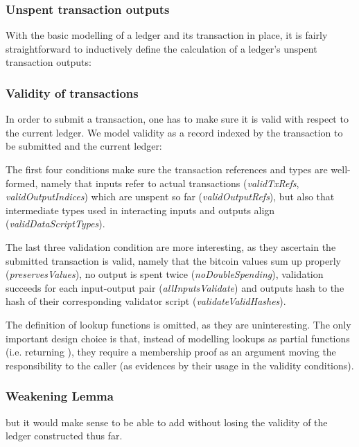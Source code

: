 \documentclass[acmsmall,nonacm=true,screen=true]{acmart}
\begin{document}
\subsubsection{Unspent transaction outputs}
With the basic modelling of a ledger and its transaction in place, it is fairly straightforward to 
inductively define the calculation of a ledger's unspent transaction outputs:

\UTXOutxo{}

\subsubsection{Validity of transactions}
In order to submit a transaction, one has to make sure it is valid with respect to the current ledger.
We model validity as a record indexed by the transaction to be submitted and the current ledger:

\UTXOvalid{}

\noindent
The first four conditions make sure the transaction references and types are well-formed, namely that
inputs refer to actual transactions (\textit{validTxRefs}, \textit{validOutputIndices})
which are unspent so far (\textit{validOutputRefs}), but also that intermediate types used in interacting
inputs and outputs align (\textit{validDataScriptTypes}).

The last three validation condition are more interesting, as they ascertain the submitted transaction is valid,
namely that the bitcoin values sum up properly (\textit{preservesValues}), no output is spent twice (\textit{noDoubleSpending}),
validation succeeds for each input-output pair (\textit{allInputsValidate}) and outputs hash to the hash of their corresponding 
validator script (\textit{validateValidHashes}).

The definition of lookup functions is omitted, as they are uninteresting. The only important design choice is that,
instead of modelling lookups as partial functions (i.e. returning \inlineMaybe{}), they require a membership
proof as an argument moving the responsibility to the caller (as evidences by their usage in the validity conditions).

\subsubsection{Weakening Lemma}

but it would make sense to be able to add 
without losing the validity of the ledger constructed thus far.
\end{document}
